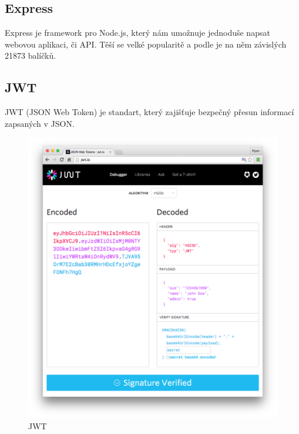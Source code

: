 \documentclass[thesis=B,czech]{FITthesis}[2012/06/26]
\begin{document}
        \subsection{Express}
            Express je framework pro Node.js, který nám umožnuje jednoduše napsat webovou aplikaci, či API. Těší se velké popularitě a podle \cite{npmrank} je na něm závislých 21873 balíčků.
        \subsection{JWT} \label{jwt}
            JWT (JSON Web Token) je standart, který zajišťuje bezpečný přesun informací zapsaných v JSON.
            \begin{figure}[h!]
                \includegraphics[width=\linewidth]{legacy-app-auth-5} 
                \caption{JWT \cite{jwtImage}}
            \end{figure}
            
\end{document}
